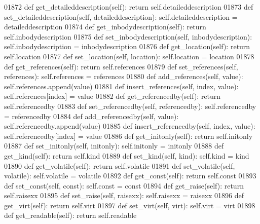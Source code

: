\begin{DoxyCode}
{{{{{{{{{{{{{{{{{{{{{{{{{{{{{{{{{{{{{{{{{{{{{{{{{{{{{{{{{{{{{{{{{{{{{{{{{{{{{{{{{{{{{{{{{{{{{{{{{{{{{{{{{{{{{{{{{{01872     \textcolor{keyword}{def }get_detaileddescription(self): \textcolor{keywordflow}{return} self.detaileddescription
01873     \textcolor{keyword}{def }set_detaileddescription(self, detaileddescription): self.detaileddescription = detaileddescription
01874     \textcolor{keyword}{def }get_inbodydescription(self): \textcolor{keywordflow}{return} self.inbodydescription
01875     \textcolor{keyword}{def }set_inbodydescription(self, inbodydescription): self.inbodydescription = inbodydescription
01876     \textcolor{keyword}{def }get_location(self): \textcolor{keywordflow}{return} self.location
01877     \textcolor{keyword}{def }set_location(self, location): self.location = location
01878     \textcolor{keyword}{def }get_references(self): \textcolor{keywordflow}{return} self.references
01879     \textcolor{keyword}{def }set_references(self, references): self.references = references
01880     \textcolor{keyword}{def }add_references(self, value): self.references.append(value)
01881     \textcolor{keyword}{def }insert_references(self, index, value): self.references[index] = value
01882     \textcolor{keyword}{def }get_referencedby(self): \textcolor{keywordflow}{return} self.referencedby
01883     \textcolor{keyword}{def }set_referencedby(self, referencedby): self.referencedby = referencedby
01884     \textcolor{keyword}{def }add_referencedby(self, value): self.referencedby.append(value)
01885     \textcolor{keyword}{def }insert_referencedby(self, index, value): self.referencedby[index] = value
01886     \textcolor{keyword}{def }get_initonly(self): \textcolor{keywordflow}{return} self.initonly
01887     \textcolor{keyword}{def }set_initonly(self, initonly): self.initonly = initonly
01888     \textcolor{keyword}{def }get_kind(self): \textcolor{keywordflow}{return} self.kind
01889     \textcolor{keyword}{def }set_kind(self, kind): self.kind = kind
01890     \textcolor{keyword}{def }get_volatile(self): \textcolor{keywordflow}{return} self.volatile
01891     \textcolor{keyword}{def }set_volatile(self, volatile): self.volatile = volatile
01892     \textcolor{keyword}{def }get_const(self): \textcolor{keywordflow}{return} self.const
01893     \textcolor{keyword}{def }set_const(self, const): self.const = const
01894     \textcolor{keyword}{def }get_raise(self): \textcolor{keywordflow}{return} self.raisexx
01895     \textcolor{keyword}{def }set_raise(self, raisexx): self.raisexx = raisexx
01896     \textcolor{keyword}{def }get_virt(self): \textcolor{keywordflow}{return} self.virt
01897     \textcolor{keyword}{def }set_virt(self, virt): self.virt = virt
01898     \textcolor{keyword}{def }get_readable(self): \textcolor{keywordflow}{return} self.readable
}}}}}}}}}}}}}}}}}}}}}}}}}}}}}}}}}}}}}}}}}}}}}}}}}}}}}}}}}}}}}}}}}}}}}}}}}}}}}}}}}}}}}}}}}}}}}}}}}}}}}}}}}}}}}}}}}}
\end{DoxyCode}
